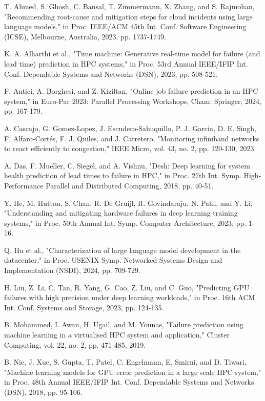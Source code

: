 \documentclass[conference]{IEEEtran}
\begin{document}
\begin{thebibliography}{00}
 T. Ahmed, S. Ghosh, C. Bansal, T. Zimmermann, X. Zhang, and S. Rajmohan, "Recommending root-cause and mitigation steps for cloud incidents using large language models," in Proc. IEEE/ACM 45th Int. Conf. Software Engineering (ICSE), Melbourne, Australia, 2023, pp. 1737-1749.

 K. A. Alharthi et al., "Time machine: Generative real-time model for failure (and lead time) prediction in HPC systems," in Proc. 53rd Annual IEEE/IFIP Int. Conf. Dependable Systems and Networks (DSN), 2023, pp. 508-521.

 F. Antici, A. Borghesi, and Z. Kiziltan, "Online job failure prediction in an HPC system," in Euro-Par 2023: Parallel Processing Workshops, Cham: Springer, 2024, pp. 167-179.

 A. Cascajo, G. Gomez-Lopez, J. Escudero-Sahuquillo, P. J. Garcia, D. E. Singh, F. Alfaro-Cortés, F. J. Quiles, and J. Carretero, "Monitoring infiniband networks to react efficiently to congestion," IEEE Micro, vol. 43, no. 2, pp. 120-130, 2023.

 A. Das, F. Mueller, C. Siegel, and A. Vishnu, "Desh: Deep learning for system health prediction of lead times to failure in HPC," in Proc. 27th Int. Symp. High-Performance Parallel and Distributed Computing, 2018, pp. 40-51.

 Y. He, M. Hutton, S. Chan, R. De Gruijl, R. Govindaraju, N. Patil, and Y. Li, "Understanding and mitigating hardware failures in deep learning training systems," in Proc. 50th Annual Int. Symp. Computer Architecture, 2023, pp. 1-16.

 Q. Hu et al., "Characterization of large language model development in the datacenter," in Proc. USENIX Symp. Networked Systems Design and Implementation (NSDI), 2024, pp. 709-729.

 H. Liu, Z. Li, C. Tan, R. Yang, G. Cao, Z. Liu, and C. Guo, "Predicting GPU failures with high precision under deep learning workloads," in Proc. 16th ACM Int. Conf. Systems and Storage, 2023, pp. 124-135.

 B. Mohammed, I. Awan, H. Ugail, and M. Younas, "Failure prediction using machine learning in a virtualised HPC system and application," Cluster Computing, vol. 22, no. 2, pp. 471-485, 2019.

 B. Nie, J. Xue, S. Gupta, T. Patel, C. Engelmann, E. Smirni, and D. Tiwari, "Machine learning models for GPU error prediction in a large scale HPC system," in Proc. 48th Annual IEEE/IFIP Int. Conf. Dependable Systems and Networks (DSN), 2018, pp. 95-106.


\end{thebibliography}
\end{document}
